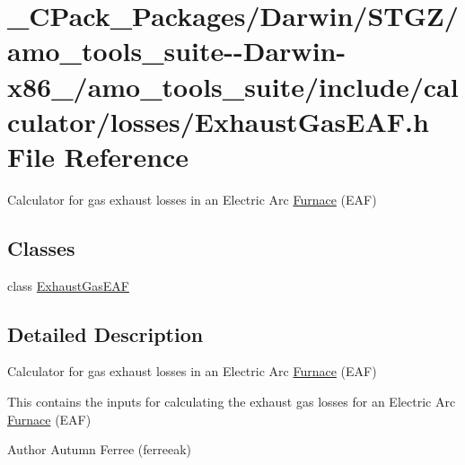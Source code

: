 \hypertarget{___c_pack___packages_2_darwin_2_s_t_g_z_2amo__tools__suite--_darwin-x86__64_2amo__tools__suite_2c5136a7303077cb660b86ee43dc41ed7}{}\section{\+\_\+\+C\+Pack\+\_\+\+Packages/\+Darwin/\+S\+T\+G\+Z/amo\+\_\+tools\+\_\+suite-\/-\/\+Darwin-\/x86\+\_/amo\+\_\+tools\+\_\+suite/include/calculator/losses/\+Exhaust\+Gas\+E\+AF.h File Reference}
\label{___c_pack___packages_2_darwin_2_s_t_g_z_2amo__tools__suite--_darwin-x86__64_2amo__tools__suite_2c5136a7303077cb660b86ee43dc41ed7}


Calculator for gas exhaust losses in an Electric Arc \hyperlink{class_furnace}{Furnace} (E\+AF)  


\subsection*{Classes}
\begin{DoxyCompactItemize}
\item 
class \hyperlink{class_exhaust_gas_e_a_f}{Exhaust\+Gas\+E\+AF}
\end{DoxyCompactItemize}


\subsection{Detailed Description}
Calculator for gas exhaust losses in an Electric Arc \hyperlink{class_furnace}{Furnace} (E\+AF) 

This contains the inputs for calculating the exhaust gas losses for an Electric Arc \hyperlink{class_furnace}{Furnace} (E\+AF)

\begin{DoxyAuthor}{Author}
Autumn Ferree (ferreeak) 
\end{DoxyAuthor}
